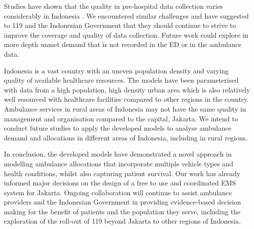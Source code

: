 \documentclass[preprint,12pt]{elsarticle}
\begin{document}
Studies have shown that the quality in pre-hospital data collection varies
considerably in Indonesia \cite{hooper2019_datacollection}. We encountered
similar challenges and have suggested to 119 and the Indonesian Government
that they should continue to strive to improve the coverage and quality of
data collection. Future work could explore in more depth unmet demand that is
not recorded in the ED or in the ambulance data.

Indonesia is a vast country with an uneven population density and varying
quality of available healthcare resources. The models have been parameterised
with data from a high population, high density urban area which is also
relatively well resourced with healthcare facilities compared to other regions
in the country. Ambulance services in rural areas of Indonesia may not have
the same quality in management and organisation compared to the capital,
Jakarta. We intend to conduct future studies to apply the developed models to
analyse ambulance demand and allocations in different areas of Indonesia,
including in rural regions.

In conclusion, the developed models have demonstrated a novel approach in
modelling ambulance allocations that incorporate multiple vehicle types and
health conditions, whilst also capturing patient survival. Our work has
already informed major decisions on the design of a free to use and
coordinated EMS system for Jakarta. Ongoing collaboration will continue to
assist ambulance providers and the Indonesian Government in providing
evidence-based decision making for the benefit of patients and the population
they serve, including the exploration of the roll-out of 119 beyond Jakarta to
other regions of Indonesia. 




\end{document}
